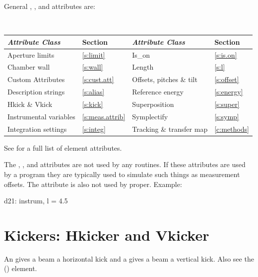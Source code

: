 General , , and  attributes are:
\begin{center}
\tt
\begin{tabular}{llll} \toprule
  {\sl Attribute Class}      & Section             & {\sl Attribute Class}      & Section         \\ \midrule
  Aperture limits            & \ref{s:limit}       & Is_on                      & \ref{s:is.on}   \\
  Chamber wall               & \ref{s:wall}        & Length                     & \ref{s:l}       \\
  Custom Attributes          & \ref{s:cust.att}    & Offsets, pitches \& tilt   & \ref{s:offset}  \\ 
  Description strings        & \ref{s:alias}       & Reference energy           & \ref{s:energy}  \\
  Hkick \& Vkick             & \ref{s:kick}        & Superposition              & \ref{s:super}   \\
  Instrumental variables     & \ref{s:meas.attrib} & Symplectify                & \ref{s:symp}    \\
  Integration settings       & \ref{s:integ}       & Tracking \& transfer map   & \ref{c:methods} \\
  \bottomrule
\end{tabular}
\end{center}
\toffset
See  for a full list of element attributes.

The , , and  attributes are not
used by any \bmad routines. If these attributes are used by a program
they are typically used to simulate such things as measurement
offsets. The  attribute is also not used by \bmad
proper. Example:
\begin{example}
  d21: instrum, l = 4.5
\end{example}

\section{Kickers: Hkicker and Vkicker}
\label{s:hvkicker}

An  gives a beam a horizontal kick and a  gives a 
beam a vertical kick. Also see the  () element.

